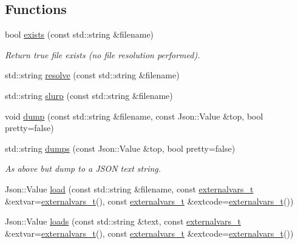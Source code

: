 \subsection*{Functions}
\begin{DoxyCompactItemize}
\item 
bool \hyperlink{namespace_wire_cell_1_1_persist_a3b9a35a2580c04da89629682d43eae40}{exists} (const std\+::string \&filename)
\begin{DoxyCompactList}\small\item\em Return true file exists (no file resolution performed). \end{DoxyCompactList}\item 
std\+::string \hyperlink{namespace_wire_cell_1_1_persist_a222a8187746d148cdc44b0b43b109e53}{resolve} (const std\+::string \&filename)
\item 
std\+::string \hyperlink{namespace_wire_cell_1_1_persist_a65787a912677f1990c010e7ee4610a9f}{slurp} (const std\+::string \&filename)
\item 
void \hyperlink{namespace_wire_cell_1_1_persist_a2acf48c85b54dfa84e3a42b610cdf780}{dump} (const std\+::string \&filename, const Json\+::\+Value \&top, bool pretty=false)
\item 
std\+::string \hyperlink{namespace_wire_cell_1_1_persist_aaaf7c0173c5331a2c4f675e8d077abf9}{dumps} (const Json\+::\+Value \&top, bool pretty=false)
\begin{DoxyCompactList}\small\item\em As above but dump to a J\+S\+ON text string. \end{DoxyCompactList}\item 
Json\+::\+Value \hyperlink{namespace_wire_cell_1_1_persist_ab922ff3e9c80bcbc9d4e8342f7d3223d}{load} (const std\+::string \&filename, const \hyperlink{namespace_wire_cell_1_1_persist_ae031fc57de5b5814ccd700d007bc847b}{externalvars\+\_\+t} \&extvar=\hyperlink{namespace_wire_cell_1_1_persist_ae031fc57de5b5814ccd700d007bc847b}{externalvars\+\_\+t}(), const \hyperlink{namespace_wire_cell_1_1_persist_ae031fc57de5b5814ccd700d007bc847b}{externalvars\+\_\+t} \&extcode=\hyperlink{namespace_wire_cell_1_1_persist_ae031fc57de5b5814ccd700d007bc847b}{externalvars\+\_\+t}())
\item 
Json\+::\+Value \hyperlink{namespace_wire_cell_1_1_persist_adce7b2acfe82eb122ed5d06f261e155e}{loads} (const std\+::string \&text, const \hyperlink{namespace_wire_cell_1_1_persist_ae031fc57de5b5814ccd700d007bc847b}{externalvars\+\_\+t} \&extvar=\hyperlink{namespace_wire_cell_1_1_persist_ae031fc57de5b5814ccd700d007bc847b}{externalvars\+\_\+t}(), const \hyperlink{namespace_wire_cell_1_1_persist_ae031fc57de5b5814ccd700d007bc847b}{externalvars\+\_\+t} \&extcode=\hyperlink{namespace_wire_cell_1_1_persist_ae031fc57de5b5814ccd700d007bc847b}{externalvars\+\_\+t}())

\end{DoxyCompactItemize}
